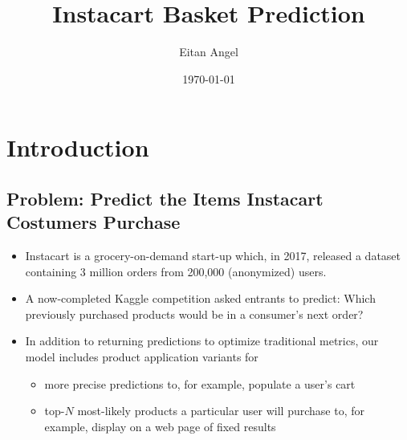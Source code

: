 \documentclass[handout]{beamer}
\title{Instacart Basket Prediction}
\author{Eitan Angel}
\date{\today}
\begin{document}
\frame{

\titlepage}



\frame{\tableofcontents[hideallsubsections]}

\usebackgroundtemplate{%
}
\section{Introduction}
  \subsection%
  {Problem: Predict the Items Instacart Costumers Purchase}
  \label{problem-predict-the-items-instacart-costumers-purchase}

\begin{frame}%

\begin{itemize}[<+->]
\item Instacart is a grocery-on-demand start-up which, in 2017, released a
dataset containing 3 million orders from 200,000 (anonymized) users. 
\vfill
\item A
now-completed Kaggle competition asked entrants to predict: Which
previously purchased products would be in a consumer's next order?
%
\vfill
\item In addition to returning predictions to optimize traditional metrics, our
model includes product application variants for 

\begin{itemize}
  \item more precise predictions to, for example, populate a user's cart

  \item top-$N$ most-likely products a particular user will purchase to, for example, display on a web page of fixed results
\end{itemize}

\end{itemize}

\end{frame}
\end{document}
